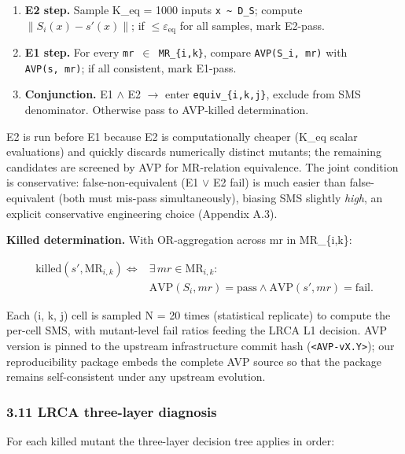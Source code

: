 \documentclass[review,12pt,authoryear]{elsarticle}
\providecommand{\tightlist}{\setlength{\itemsep}{0pt}\setlength{\parskip}{0pt}}
\begin{document}
\begin{enumerate}
\def\labelenumi{(\alph{enumi})}
\tightlist
\item
  \textbf{E2 step.} Sample K\_eq = 1000 inputs
  \texttt{x\ \textasciitilde{}\ D\_S}; compute
  $\|S_i(x) - s'(x)\|$; if $\leq \varepsilon_{\mathrm{eq}}$ for all
  samples, mark E2-pass.
\item
  \textbf{E1 step.} For every \texttt{mr\ $\in$\ MR\_\{i,k\}}, compare
  \texttt{AVP(S\_i,\ mr)} with \texttt{AVP(s\textquotesingle{},\ mr)};
  if all consistent, mark E1-pass.
\item
  \textbf{Conjunction.} E1 $\wedge$ E2 $\to$ enter \texttt{equiv\_\{i,k,j\}},
  exclude from SMS denominator. Otherwise pass to AVP-killed
  determination.
\end{enumerate}

E2 is run before E1 because E2 is computationally cheaper (K\_eq scalar
evaluations) and quickly discards numerically distinct mutants; the
remaining candidates are screened by AVP for MR-relation equivalence.
The joint condition is conservative: false-non-equivalent (E1 $\vee$ E2 fail)
is much easier than false-equivalent (both must mis-pass
simultaneously), biasing SMS slightly \emph{high}, an explicit
conservative engineering choice (Appendix A.3).

\textbf{Killed determination.} With OR-aggregation across mr in
MR\_\{i,k\}:

\[
\begin{aligned}
\mathrm{killed}(s', \mathrm{MR}_{i,k}) \iff{} & \exists\,mr \in \mathrm{MR}_{i,k}: \\
& \mathrm{AVP}(S_i, mr) = \text{pass} \wedge
  \mathrm{AVP}(s', mr) = \text{fail}.
\end{aligned}
\]

Each (i, k, j) cell is sampled N = 20 times (statistical replicate) to
compute the per-cell SMS, with mutant-level fail ratios feeding the LRCA
L1 decision. AVP version is pinned to the upstream infrastructure commit hash
(\texttt{\textless{}AVP-vX.Y\textgreater{}}); our reproducibility
package embeds the complete AVP source so that the package remains
self-consistent under any upstream evolution.

\subsubsection{3.11 LRCA three-layer diagnosis}\label{lrca-three-layer-diagnosis}

For each killed mutant the three-layer decision tree applies in order:
\end{document}

